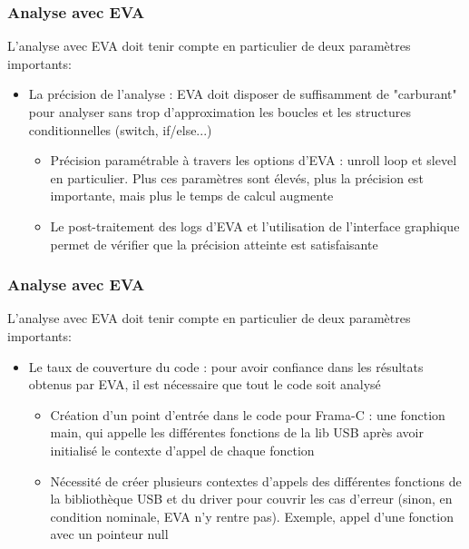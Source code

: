 \documentclass[french]{beamer}
\begin{document}
 \begin{frame}
 \frametitle{Analyse avec EVA}

 L'analyse avec EVA doit tenir compte en particulier de deux paramètres importants:
 \begin{itemize}
 	\item  	\justifyit La précision de l'analyse : EVA doit disposer de suffisamment de "carburant" pour analyser sans trop d'approximation les boucles et les structures conditionnelles (switch, if/else...)
 		\begin{itemize}
 			\item \justifyit Précision paramétrable à travers les options d'EVA : unroll loop et slevel en particulier. Plus ces paramètres sont élevés, plus la précision est importante, mais plus le temps de calcul augmente
 			\item \justifyit Le post-traitement des logs d'EVA et l'utilisation de l'interface graphique permet de vérifier que la précision atteinte est satisfaisante
 		\end{itemize}
 \end{itemize}

\end{frame}

 \begin{frame}
 \frametitle{Analyse avec EVA}

 L'analyse avec EVA doit tenir compte en particulier de deux paramètres importants:
 \begin{itemize}
 	\item Le taux de couverture du code : pour avoir confiance dans les résultats obtenus par EVA, il est nécessaire que tout le code soit analysé
 			\begin{itemize}
 			\item \justifyit Création d'un point d'entrée dans le code pour Frama-C : une fonction main, qui appelle les différentes fonctions de la lib USB après avoir initialisé le contexte d'appel de chaque fonction
 			\item \justifyit Nécessité de créer plusieurs contextes d'appels des différentes fonctions de la bibliothèque USB et du driver pour couvrir les cas d'erreur (sinon, en condition nominale, EVA n'y rentre pas). Exemple, appel d'une fonction avec un pointeur null
 		\end{itemize}

 \end{itemize}

 \end{frame}
\end{document}

